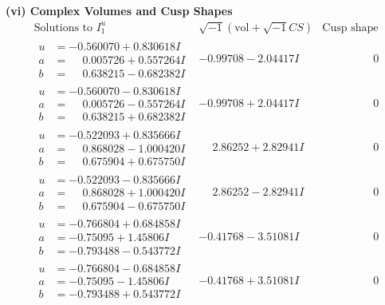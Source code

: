 \documentclass[1p]{elsarticle_modified}
\theoremstyle{definition}
\newcommand{\I}{\sqrt{-1}}
\begin{document}
\newpage\flushleft \textbf{(vi) Complex Volumes and Cusp Shapes}
$$\begin{array}{c|c|c}  
\text{Solutions to }I^u_{1}& \I (\text{vol} + \sqrt{-1}CS) & \text{Cusp shape}\\
 \hline 
\begin{aligned}
u &= -0.560070 + 0.830618 I \\
a &= \phantom{-}0.005726 + 0.557264 I \\
b &= \phantom{-}0.638215 - 0.682382 I\end{aligned}
 & -0.99708 - 2.04417 I & \phantom{-0.000000 } 0 \\ \hline\begin{aligned}
u &= -0.560070 - 0.830618 I \\
a &= \phantom{-}0.005726 - 0.557264 I \\
b &= \phantom{-}0.638215 + 0.682382 I\end{aligned}
 & -0.99708 + 2.04417 I & \phantom{-0.000000 } 0 \\ \hline\begin{aligned}
u &= -0.522093 + 0.835666 I \\
a &= \phantom{-}0.868028 - 1.000420 I \\
b &= \phantom{-}0.675904 + 0.675750 I\end{aligned}
 & \phantom{-}2.86252 + 2.82941 I & \phantom{-0.000000 } 0 \\ \hline\begin{aligned}
u &= -0.522093 - 0.835666 I \\
a &= \phantom{-}0.868028 + 1.000420 I \\
b &= \phantom{-}0.675904 - 0.675750 I\end{aligned}
 & \phantom{-}2.86252 - 2.82941 I & \phantom{-0.000000 } 0 \\ \hline\begin{aligned}
u &= -0.766804 + 0.684858 I \\
a &= -0.75095 + 1.45806 I \\
b &= -0.793488 - 0.543772 I\end{aligned}
 & -0.41768 - 3.51081 I & \phantom{-0.000000 } 0 \\ \hline\begin{aligned}
u &= -0.766804 - 0.684858 I \\
a &= -0.75095 - 1.45806 I \\
b &= -0.793488 + 0.543772 I\end{aligned}
 & -0.41768 + 3.51081 I & \phantom{-0.000000 } 0 \\ \hline\begin{aligned}

\end{aligned}
\end{array}$$
\end{document}
